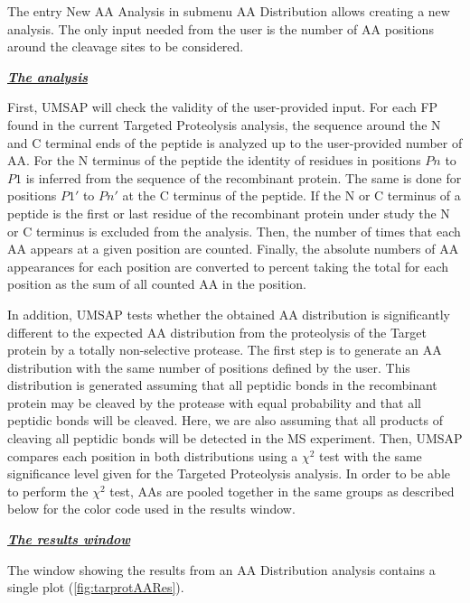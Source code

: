 The entry New AA Analysis in submenu AA Distribution allows creating a new analysis.
The only input needed from the user is the number of AA positions around the cleavage
sites to be considered.

\textit{\textbf{\underline{The analysis}}}

First, UMSAP will check the validity of the user-provided input. For each FP found
in the current Targeted Proteolysis analysis, the sequence around the N and C terminal
ends of the peptide is analyzed up to the user-provided number of AA. For the N terminus
of the peptide the identity of residues in positions \(Pn\) to \(P1\) is inferred
from the sequence of the recombinant protein. The same is done for positions \(P1'\)
to \(Pn'\) at the C terminus of the peptide. If the N or C terminus of a peptide is
the first or last residue of the recombinant protein under study the N or C terminus
is excluded from the analysis. Then, the number of times that each AA
appears at a given position are counted. Finally, the absolute numbers of AA appearances
for each position are converted to percent taking the total for each position as the
sum of all counted AA in the position.

In addition, UMSAP tests whether the obtained AA distribution is significantly different
to the expected AA distribution from the proteolysis of the Target protein by a
totally non-selective protease. The first step is to generate an AA distribution with
the same number of positions defined by the user. This
distribution is generated assuming that all peptidic bonds in the recombinant protein
may be cleaved by the protease with equal probability and that all peptidic bonds
will be cleaved. Here, we are also assuming that all products of cleaving all peptidic
bonds will be detected in the MS experiment. Then, UMSAP compares each position in
both distributions using a $\chi^2$ test with the same significance level given for
the Targeted Proteolysis analysis. In order to be able to perform the $\chi^2$ test,
AAs are pooled together in the same groups as described below for the color code
used in the results window.

\textit{\textbf{\underline{The results window}}} 

The window showing the results from an AA Distribution analysis contains a single
plot (\autoref{fig:tarprotAARes}).

